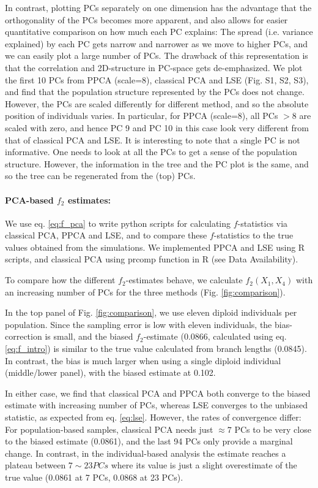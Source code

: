\documentclass[12pt]{article}
\begin{document}
In contrast, plotting PCs separately on one dimension has the advantage that the orthogonality of the PCs becomes more apparent, and also allows for easier quantitative comparison on how much each PC explains: The spread (i.e. variance explained) by each PC gets narrow and narrower as we move to higher PCs, and we can easily plot a large number of PCs. The drawback of this representation is that the correlation and 2D-structure in PC-space gets de-emphasized. We plot the first 10 PCs from PPCA (scale=8), classical PCA and LSE (Fig. S1, S2, S3), and find that the population structure represented by the PCs does not change. However, the PCs are scaled differently for different method, and so the absolute position of individuals varies. In particular, for PPCA (scale=8), all PCs $>8$ are scaled with zero, and hence PC 9 and PC 10 in this case look very different from that of classical PCA and LSE.     
It is interesting to note that a single PC is not informative. One needs to look at all the PCs to get a sense of the population structure. However, the information in the tree and the PC plot is the same, and so the tree can be regenerated from the (top) PCs. 

\paragraph{PCA-based $f_2$ estimates:}
We use eq. \ref{eq:f_pca} to write python scripts for calculating $f$-statistics via classical PCA, PPCA and LSE, and to compare these $f$-statistics to the true values obtained from  the simulations. We implemented PPCA and LSE using R scripts, and classical PCA using prcomp function in R (see Data Availability). 

To compare how the different $f_2$-estimates behave, we calculate $f_2(X_1, X_4)$  with an increasing number of PCs for the three methods (Fig. \ref{fig:comparison}).  

In the top panel of Fig. \ref{fig:comparison}, we use eleven diploid individuals per population. Since the sampling error is low with eleven individuals, the bias-correction is small, and the biased $f_2$-estimate (0.0866, calculated using eq. \ref{eq:f_intro}) is similar to the true value calculated from branch lengths (0.0845). In contrast, the bias is much larger when using a single diploid individual (middle/lower panel), with the biased estimate at 0.102. 

In either case, we find that classical PCA and PPCA both converge to the biased estimate with increasing number of PCs, whereas LSE converges to the unbiased statistic, as expected from eq. \ref{eq:lse}. However, the rates of convergence differ: For population-based samples, classical PCA needs just $\approx 7$ PCs to be very close to the biased estimate (0.0861), and the last 94 PCs only provide a marginal change. In contrast, in the individual-based analysis the estimate reaches a plateau between $7 \sim 23 PCs$ where its value is just a slight overestimate of the true value (0.0861 at 7 PCs, 0.0868 at 23 PCs).
\end{document}
